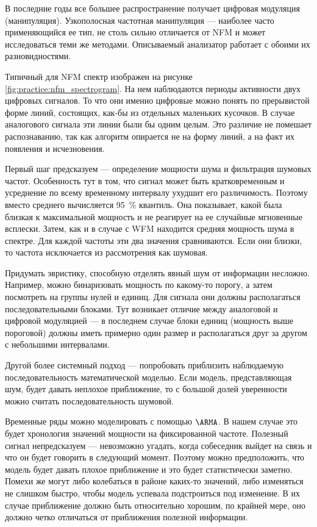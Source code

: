 В последние годы все большее распространение получает цифровая модуляция (манипуляция). Узкополосная частотная манипуляция --- наиболее часто применяющийся ее тип, не столь сильно отличается от NFM и может исследоваться теми же методами. Описываемый анализатор работает с обоими их разновидностями.

Типичный для NFM спектр изображен на рисунке \ref{fig:practice:nfm_spectrogram}. На нем наблюдаются периоды активности двух цифровых сигналов. То что они именно цифровые можно понять по прерывистой форме линий, состоящих, как-бы из отдельных маленьких кусочков. В случае аналогового сигнала эти линии были бы одним целым. Это различие не помешает распознаванию, так как алгоритм опирается не на форму линий, а на факт их появления и исчезновения.

Первый шаг предсказуем --- определение мощности шума и фильтрация шумовых частот. Особенность тут в том, что сигнал может быть кратковременным и усреднение по всему временному интервалу ухудшит его различимость. Поэтому вместо среднего вычисляется \SI{95}{\percent} квантиль. Она показывает, какой была близкая к максимальной мощность и не реагирует на ее случайные мгновенные всплески. Затем, как и в случае с WFM находится средняя мощность шума в спектре. Для каждой частоты эти два значения сравниваются. Если они близки, то частота исключается из рассмотрения как шумовая.

Придумать эвристику, способную отделять явный шум от информации несложно. Например, можно бинаризовать мощность по какому-то порогу, а затем посмотреть на группы нулей и единиц. Для сигнала они должны располагаться последовательными блоками. Тут возникает отличие между аналоговой и цифровой модуляцией --- в последнем случае блоки единиц (мощность выше пороговой) должны иметь примерно один размер и располагаться друг за другом с небольшими интервалами.

Другой более системный подход --- попробовать приблизить наблюдаемую последовательность математической моделью. Если модель, представляющая шум, будет давать неплохое приближение, то с большой долей уверенности можно считать последовательность шумовой.

Временные ряды можно моделировать с помощью $\ARMA$. В нашем случае это будет хронология значений мощности на фиксированной частоте. Полезный сигнал непредсказуем --- невозможно угадать, когда собеседник выйдет на связь и что он будет говорить в следующий момент. Поэтому можно предположить, что модель будет давать плохое приближение и это будет статистически заметно. Помехи же могут либо колебаться в районе каких-то значений, либо изменяться не слишком быстро, чтобы модель успевала подстроиться под изменение. В их случае приближение должно быть относительно хорошим, по крайней мере, оно должно четко отличаться от приближения полезной информации.

